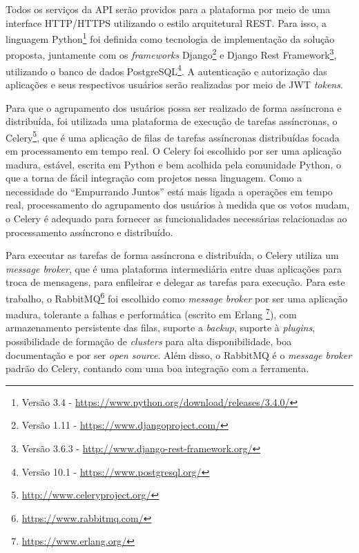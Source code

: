     Todos os serviços da API serão providos para a plataforma por meio de uma interface HTTP/HTTPS utilizando o estilo arquitetural REST.
    Para isso, a linguagem Python\footnote{Versão 3.4 - \href{https://www.python.org/download/releases/3.4.0/}{https://www.python.org/download/releases/3.4.0/}} 
    foi definida como tecnologia de implementação da solução proposta, juntamente com os \textit{frameworks}
    Django\footnote{Versão 1.11 - \href{https://www.djangoproject.com/}{https://www.djangoproject.com/}} e 
    Django Rest Framework\footnote{Versão 3.6.3 - \href{http://www.django-rest-framework.org/}{http://www.django-rest-framework.org/}}, 
    utilizando o banco de dados PostgreSQL\footnote{Versão 10.1 - \href{https://www.postgresql.org/}{https://www.postgresql.org/}}.
    A autenticação e autorização das aplicações e seus respectivos usuários serão realizadas por meio de JWT \textit{tokens}.
     
    Para que o agrupamento dos usuários possa ser realizado de forma assíncrona e distribuída, 
    foi utilizada uma plataforma de execução de tarefas assíncronas,
    o Celery\footnote{\href{http://www.celeryproject.org/}{http://www.celeryproject.org/}},
    que é uma aplicação de filas de tarefas assíncronas distribuídas focada em processamento em tempo real.
    O Celery foi escolhido por ser uma aplicação madura, estável, escrita em Python e bem acolhida pela comunidade Python,
    o que a torna de fácil integração com projetos nessa linguagem.
    Como a necessidade do ``Empurrando Juntos'' está mais ligada a operações em tempo real,
    processamento do agrupamento dos usuários à medida que os votos mudam,
    o Celery é adequado para fornecer as funcionalidades necessárias relacionadas ao processamento assíncrono e distribuído.
    
    Para executar as tarefas de forma assíncrona e distribuída, o Celery utiliza um \textit{message broker},
    que é uma plataforma intermediária entre duas aplicações para troca de mensagens,
    para enfileirar e delegar as tarefas para execução. 
    Para este trabalho, o RabbitMQ\footnote{\href{https://www.rabbitmq.com/}{https://www.rabbitmq.com/}}
    foi escolhido como \textit{message broker} por ser uma aplicação madura, tolerante a falhas e performática
    (escrito em Erlang \footnote{\href{https://www.erlang.org/}{https://www.erlang.org/}}),
    com armazenamento persistente das filas, suporte a \textit{backup}, suporte à \textit{plugins},
    possibilidade de formação de \textit{clusters} para alta disponibilidade,
    boa documentação e por ser \textit{open source}.
    Além disso, o RabbitMQ é o \textit{message broker} padrão do Celery, contando com uma boa integração com a ferramenta.
    
